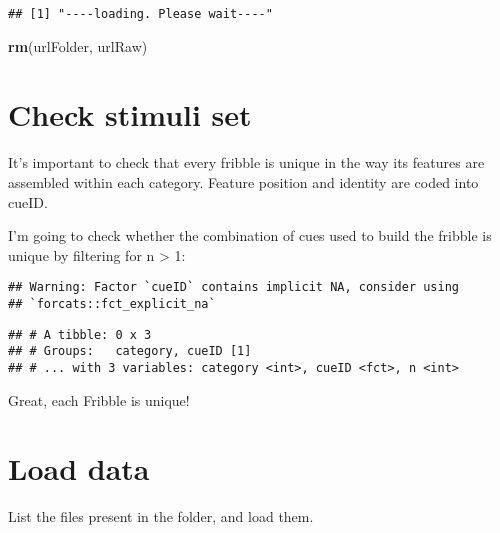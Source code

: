 \documentclass[
]{article}
\newenvironment{Shaded}{\begin{snugshade}}{\end{snugshade}}
\newcommand{\DecValTok}[1]{\textcolor[rgb]{0.00,0.00,0.81}{#1}}
\newcommand{\KeywordTok}[1]{\textcolor[rgb]{0.13,0.29,0.53}{\textbf{#1}}}
\newcommand{\NormalTok}[1]{#1}
\newcommand{\OperatorTok}[1]{\textcolor[rgb]{0.81,0.36,0.00}{\textbf{#1}}}
\newcommand{\StringTok}[1]{\textcolor[rgb]{0.31,0.60,0.02}{#1}}
\begin{document}
\begin{verbatim}
## [1] "----loading. Please wait----"
\end{verbatim}

\begin{Shaded}
\begin{Highlighting}[]
\KeywordTok{rm}\NormalTok{(urlFolder, urlRaw)}
\end{Highlighting}
\end{Shaded}

\hypertarget{check-stimuli-set}{%
\section{Check stimuli set}\label{check-stimuli-set}}

It's important to check that every fribble is unique in the way its
features are assembled within each category. Feature position and
identity are coded into cueID.

I'm going to check whether the combination of cues used to build the
fribble is unique by filtering for n \textgreater{} 1:

\begin{Shaded}
\end{Shaded}

\begin{verbatim}
## Warning: Factor `cueID` contains implicit NA, consider using
## `forcats::fct_explicit_na`
\end{verbatim}

\begin{verbatim}
## # A tibble: 0 x 3
## # Groups:   category, cueID [1]
## # ... with 3 variables: category <int>, cueID <fct>, n <int>
\end{verbatim}

Great, each Fribble is unique!

\hypertarget{load-data}{%
\section{Load data}\label{load-data}}

List the files present in the folder, and load them.
\end{document}
